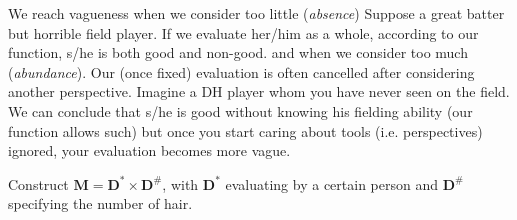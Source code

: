 \documentclass{tufte-handout}
\begin{document}
We reach vagueness when we consider too little (\emph{absence})
Suppose a great batter but horrible field player. If we evaluate her/him as a whole, according to our function, s/he is both good and non-good.
 and when we consider too much (\emph{abundance}).
Our (once fixed) evaluation is often cancelled after considering another perspective. Imagine a DH player whom you have never seen on the field. We can conclude that s/he is good without knowing his fielding ability (our function allows such) but once you start caring about tools (i.e. perspectives) ignored, your evaluation becomes more vague.








Construct $\mathbf{M = D^* \times D^\#}$, with $\mathbf{D^*}$ evaluating by a certain person  and $\mathbf{D^\#}$ specifying the number of hair.
\end{document}
